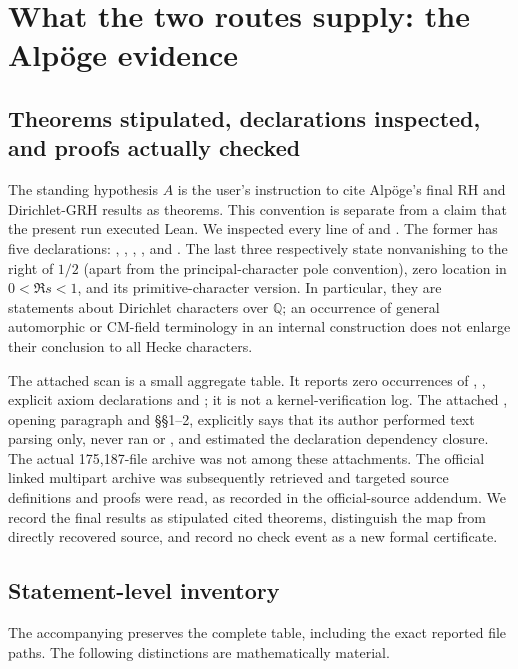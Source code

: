 \documentclass[11pt,a4paper]{article}
\theoremstyle{definition}
\begin{document}
\section{What the two routes supply: the Alp\"oge evidence}
\label{sec:alpoge-evidence}

\subsection{Theorems stipulated, declarations inspected, and proofs actually checked}
The standing hypothesis \(A\) is the user's instruction to cite Alp\"oge's
final RH and Dirichlet-GRH results as theorems.  This convention is separate
from a claim that the present run executed Lean.  We inspected every line of
 and .  The former has
five declarations: ,
,
,
, and
.  The last three respectively
state nonvanishing to the right of \(1/2\) (apart from the principal-character
pole convention), zero location in \(0<\Re s<1\), and its primitive-character
version.  In particular, they are statements about Dirichlet characters over
\(\mathbb Q\); an occurrence of general automorphic or CM-field terminology in
an internal construction does not enlarge their conclusion to all Hecke
characters.

The attached scan is a small aggregate table.  It reports zero occurrences of
, , explicit axiom declarations and
; it is not a kernel-verification log.  The attached
, opening paragraph and \S\S1--2, explicitly
says that its author performed text parsing only, never ran  or
, and estimated the declaration dependency closure.  The actual
175,187-file archive was not among these attachments.  The official linked
multipart archive was subsequently retrieved and targeted source definitions
and proofs were read, as recorded in the official-source addendum.  We
record the final results as stipulated cited theorems, distinguish the map
from directly recovered source, and record no check event as a new formal
certificate.

\subsection{Statement-level inventory}
\label{sec:alpoge-table}
The accompanying  preserves the complete table,
including the exact reported file paths.  The following distinctions are
mathematically material.
\end{document}

